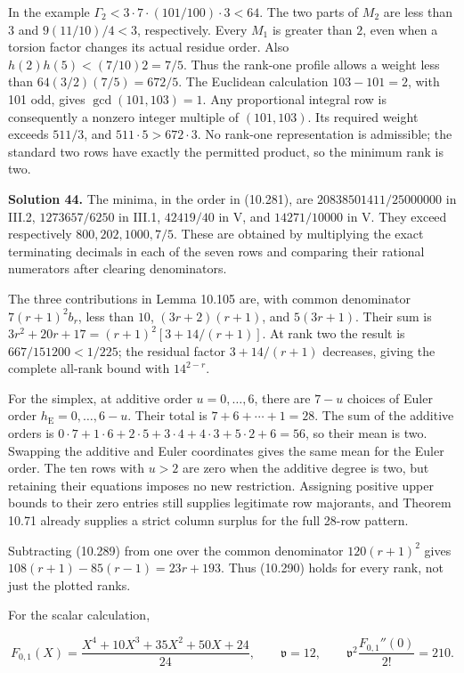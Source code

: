 \documentclass[
  11pt,
  a4paper,
]{article}
\begin{document}
In the example \(\Gamma_2<3\cdot7\cdot(101/100)\cdot3<64\). The two
parts of \(M_2\) are less than \(3\) and \(9(11/10)/4<3\), respectively.
Every \(M_1\) is greater than \(2\), even when a torsion factor changes
its actual residue order. Also \(h(2)h(5)<(7/10)2=7/5\). Thus the
rank-one profile allows a weight less than \(64(3/2)(7/5)=672/5\). The
Euclidean calculation \(103-101=2\), with 101 odd, gives
\(\gcd(101,103)=1\). Any proportional integral row is consequently a
nonzero integer multiple of \((101,103)\). Its required weight exceeds
\(511/3\), and \(511\cdot5>672\cdot3\). No rank-one representation is
admissible; the standard two rows have exactly the permitted product, so
the minimum rank is two.

\textbf{Solution 44.} The minima, in the order in (10.281), are
\(20838501411/25000000\) in III.2, \(1273657/6250\) in III.1,
\(42419/40\) in V, and \(14271/10000\) in V. They exceed respectively
\(800,202,1000,7/5\). These are obtained by multiplying the exact
terminating decimals in each of the seven rows and comparing their
rational numerators after clearing denominators.

The three contributions in Lemma 10.105 are, with common denominator
\(7(r+1)^2b_r\), less than \(10\), \((3r+2)(r+1)\), and \(5(3r+1)\).
Their sum is \(3r^2+20r+17=(r+1)^2[3+14/(r+1)]\). At rank two the result
is \(667/151200<1/225\); the residual factor \(3+14/(r+1)\) decreases,
giving the complete all-rank bound with \(14^{2-r}\).

For the simplex, at additive order \(u=0,\ldots,6\), there are \(7-u\)
choices of Euler order \(h_{\mathrm E}=0,\ldots,6-u\). Their total is
\(7+6+\cdots+1=28\). The sum of the additive orders is
\(0\cdot7+1\cdot6+2\cdot5+3\cdot4+4\cdot3+5\cdot2+6=56\), so their mean
is two. Swapping the additive and Euler coordinates gives the same mean
for the Euler order. The ten rows with \(u>2\) are zero when the
additive degree is two, but retaining their equations imposes no new
restriction. Assigning positive upper bounds to their zero entries still
supplies legitimate row majorants, and Theorem 10.71 already supplies a
strict column surplus for the full 28-row pattern.

Subtracting (10.289) from one over the common denominator \(120(r+1)^2\)
gives \(108(r+1)-85(r-1)=23r+193\). Thus (10.290) holds for every rank,
not just the plotted ranks.

For the scalar calculation,

\[
F_{0,1}(X)=\frac{X^4+10X^3+35X^2+50X+24}{24},
\qquad \mathfrak v=12,
\qquad \mathfrak v^2\frac{F_{0,1}''(0)}{2!}=210.
\]
\end{document}
